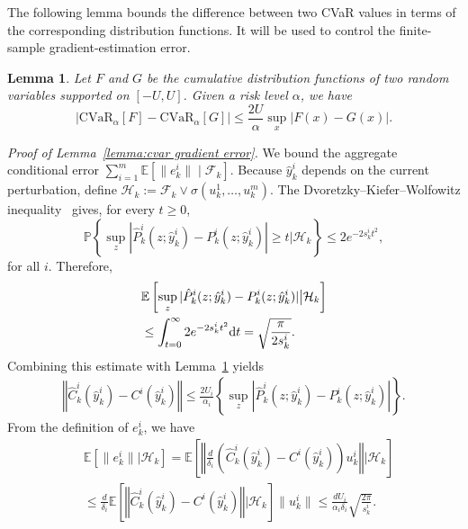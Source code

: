 \documentclass[twocolumn]{autart}    %
\newcommand{\prt}[1]{\left(#1\right)}
\newcommand{\brk}[1]{\left[#1\right]}
\newcommand{\crk}[1]{\left\{#1\right\}}
\newcommand{\norm}[1]{\left\Vert #1 \right\Vert}
\newtheorem{lemma}{Lemma}
\newcommand{\1}{\mathbf{1}}
\begin{document}
The following lemma bounds the difference between two CVaR values in terms of the corresponding distribution functions. 
It will be used to control the finite-sample gradient-estimation error.
\begin{lemma}\cite[Lemma 3]{wang2022risk}\label{lemma:cvar-estimation error bound} 
Let $F$ and $G$ be the cumulative distribution functions of two random variables supported on $[-U,U]$. 
Given a risk level $\alpha$, we have 
\begin{equation*} 
    \Big|\text{CVaR}_\alpha[F] - \text{CVaR}_\alpha [G] \Big| \le \frac{2U}{\alpha} \sup_{x} \big|F(x)-G(x)\big|. 
\end{equation*} 
\end{lemma}
\textit{Proof of Lemma~\ref{lemma:cvar gradient error}.}
We bound the aggregate conditional error $\sum_{i=1}^m\mathbb E[\|e_k^i\|\mid\mathcal F_k]$. Because $\hat y_k^i$ depends on the current perturbation, define $\mathcal H_k:=\mathcal F_k\vee\sigma(u_k^1,\ldots,u_k^m)$.
The Dvoretzky--Kiefer--Wolfowitz inequality~\cite{dvoretzky1956asymptotic} gives, for every $t\ge0$,
\begin{equation*}
    \mathbb{P}\left\{ \sup_{z} |\hat{P}_k^i(z;\hat{y}_k^i) - P_k^i(z;\hat{y}_k^i)| \ge t | \mathcal{H}_k \right\}  \le   2e^{-2s_k^it^2}, 
\end{equation*}
for all $i$. 
Therefore, \begin{align*}
& \mathbb{E} \brk{\sup_{z} |\hat{P}_k^i(z;\hat{y}_k^i) - P_k^i(z;\hat{y}_k^i)|  \big| \mathcal{H}_k }   \nonumber\\
&\le \int_{t=0}^\infty 2  e^{-2s_k^it^2} {\rm d} t = \sqrt{\frac{\pi}{2s_k^i}}.
\end{align*}
Combining this estimate with Lemma~\ref{lemma:cvar-estimation error bound} yields
\begin{align}\label{eq: cvar error}
    \norm{ \widehat{C}_k^i(\hat{y}_k^i) - C^i(\hat{y}_k^i)} \!\le\!  \frac{2U_i}{\alpha_i}\! \crk{\!\sup_{z} |\hat{P}_k^i(z;\hat{y}_k^i) - P_k^i(z;\hat{y}_k^i)|}.
\end{align}
From the definition of $e_k^i$, we have
\begin{align*}
    & \mathbb{E}\brk{\|e_k^i \| | \mathcal{H}_k} = \mathbb{E}\brk{ \norm{ \frac{d}{\delta_i}\prt{\widehat{C}_k^i(\hat{y}_k^i) - C^i(\hat{y}_k^i)}u_k^i} \bigg| \mathcal{H}_k} \\ 
    &\le \frac{d}{\delta_i} \mathbb{E}\brk{\norm{ \widehat{C}_k^i(\hat{y}_k^i) - C^i(\hat{y}_k^i)} \bigg| \mathcal{H}_k}  \|u_k^i\| \le  \frac{  dU_i}{\alpha_i\delta_i} \sqrt{\frac{2\pi}{s_k^i}}.
\end{align*}  
\end{document}
